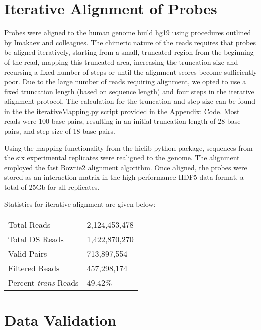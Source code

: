 \chapter{Iterative Alignment of Probes}

Probes were aligned to the human genome build hg19 using procedures outlined by
Imakaev and colleagues\cite{imakaev2012}.  The chimeric nature of the reads
requires that probes be aligned iteratively, starting from a small, truncated
region from the beginning of the read, mapping this truncated area, increasing
the truncation size and recursing a fixed number of steps or until the alignment
scores become sufficiently poor.  Due to the large number of reads requiring
alignment, we opted to use a fixed truncation length (based on sequence length)
and four steps in the iterative alignment protocol.  The calculation
for the truncation and step size can be found in the the iterativeMapping.py
script provided in the Appendix: Code.  Most reads were 100 base pairs, resulting
in an initial truncation length of 28 base pairs, and step size of 18 base pairs.

Using the mapping functionality from the hiclib python package\cite{imakaev2012},
sequences from the six experimental replicates were realigned to the genome.  The
alignment employed the fast Bowtie2 alignment algorithm\cite{langmead2012}.  Once
aligned, the probes were stored as an interaction matrix in the high performance
HDF5\cite{hdf5} data format, a total of 25Gb for all replicates.

Statistics for iterative alignment are given below:

\begin{center}
  \begin{table}
    \begin{tabular}{l l}
    Total Reads & 2,124,453,478 \\
    Total DS Reads & 1,422,870,270 \\
    Valid Pairs & 713,897,554 \\
    Filtered Reads & 457,298,174 \\
    Percent \textit{trans} Reads & 49.42\% \\
    \end{tabular}
  \end{table}
\end{center}


\chapter{Data Validation}

